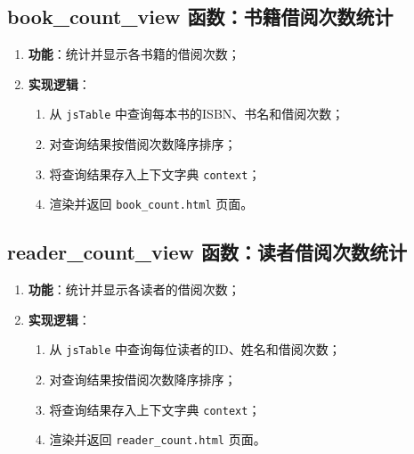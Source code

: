 \documentclass{ctexart}
\begin{document}
\subsection{book\_count\_view 函数：书籍借阅次数统计}
\begin{enumerate}
    \item \textbf{功能}：统计并显示各书籍的借阅次数；
    \item \textbf{实现逻辑}：
    \begin{enumerate}
        \item 从 \texttt{jsTable} 中查询每本书的ISBN、书名和借阅次数；
        \item 对查询结果按借阅次数降序排序；
        \item 将查询结果存入上下文字典 \texttt{context}；
        \item 渲染并返回 \texttt{book\_count.html} 页面。
    \end{enumerate}
\end{enumerate}

\subsection{reader\_count\_view 函数：读者借阅次数统计}
\begin{enumerate}
    \item \textbf{功能}：统计并显示各读者的借阅次数；
    \item \textbf{实现逻辑}：
    \begin{enumerate}
        \item 从 \texttt{jsTable} 中查询每位读者的ID、姓名和借阅次数；
        \item 对查询结果按借阅次数降序排序；
        \item 将查询结果存入上下文字典 \texttt{context}；
        \item 渲染并返回 \texttt{reader\_count.html} 页面。
    \end{enumerate}
\end{enumerate}
	\section{}
	\section{}
	\section{}
	\section{}
	\section{}
	\section{}

	
\end{document}
